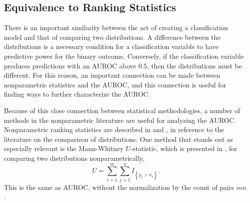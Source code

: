 \subsection{Equivalence to Ranking Statistics}



There is an important similarity between the act of creating a classification model and that of comparing two distributions.
%
A difference between the distributions is a necessary condition for a classification variable to have predictive power for the binary outcome.
Conversely, if the classification variable produces predictions with an AUROC above $0.5$, then the distributions must be different.
%
For this reason, an important connection can be made between nonparametric statistics and the AUROC, and this connection is useful for finding ways to further characterize the AUROC.

% 






Because of this close connection between statistical methodologies, a number of methods in the nonparametric literature are useful for analyzing the AUROC.
Nonparametric ranking statistics are described in \citet{lehmann2006} and \citet{kendall1990}, in reference to the literature on the comparison of distributions.
One method that stands out as especially relevant is the
Mann-Whitney $U$-statistic, which is presented in \citet{mannwhitney1947}, for comparing two distributions nonparametrically,
%
\begin{equation}
    U = \sum_{i = 1}^{m} \sum_{j = 1}^{n} I_{\left\{ y_j > x_i \right\}}.
\end{equation}
%
This is the same as AUROC, without the normalization by the count of pairs $m n$.

